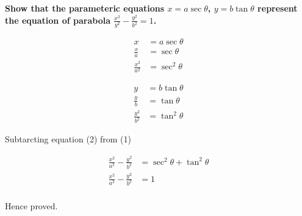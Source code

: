 \documentclass[crop=false,fleqn]{standalone}
\begin{document}
    \textbf{
        Show that the parameteric equations $x=a\sec\theta$, $y=b\tan\theta$
        represent the equation of parabola $\frac{x^2}{y^2}-\frac{y^2}{b^2}=1$.
    }

    \begin{multicols}{2}
        \begin{align*}
            x &= a\sec\theta \\
            \frac{x}{a} &= \sec\theta \\
            \frac{x^2}{a^2} &= \sec^2\theta \tag{1}
        \end{align*}

        \begin{align*}
            y &= b\tan\theta \\
            \frac{y}{b} &= \tan\theta \\
            \frac{y^2}{b^2} &= \tan^2\theta  \tag{2}
        \end{align*}
    \end{multicols}

    Subtarcting equation (2) from (1)

    \begin{align*}
        \frac{x^2}{a^2} - \frac{y^2}{b^2} &= \sec^2\theta + \tan^2\theta \\
        \frac{x^2}{a^2} - \frac{y^2}{b^2} &= 1 \\
    \end{align*}

    Hence proved.
\end{document}
